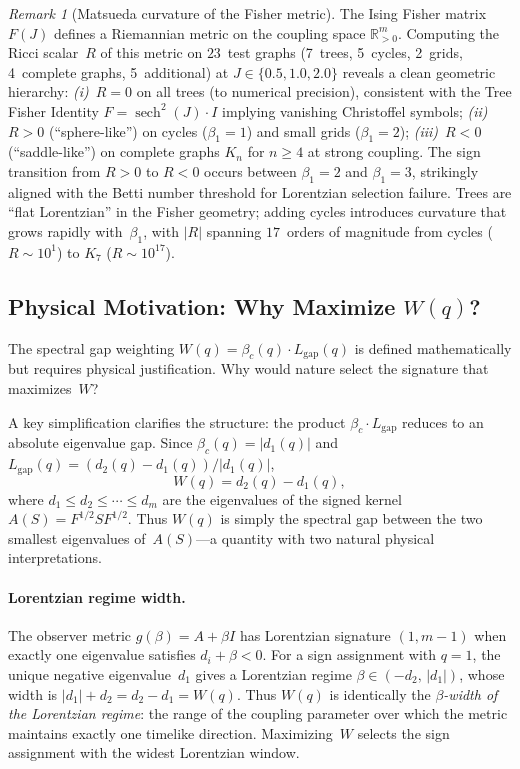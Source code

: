 \documentclass[11pt]{article}
\theoremstyle{definition}
\theoremstyle{remark}
\newtheorem{remark}[theorem]{Remark}
\begin{document}
\begin{remark}[Matsueda curvature of the Fisher metric]
\label{rem:matsueda-curvature}
The Ising Fisher matrix $F(J)$ defines a Riemannian metric on the
coupling space $\mathbb{R}^m_{>0}$. Computing the Ricci scalar~$R$ of
this metric on $23$~test graphs (7~trees, 5~cycles, 2~grids, 4~complete
graphs, 5~additional) at $J \in \{0.5, 1.0, 2.0\}$ reveals a clean
geometric hierarchy:
\emph{(i)}~$R = 0$ on all trees (to numerical precision), consistent
with the Tree Fisher Identity $F = \operatorname{sech}^2(J) \cdot I$
implying vanishing Christoffel symbols;
\emph{(ii)}~$R > 0$ (``sphere-like'') on cycles ($\beta_1 = 1$) and
small grids ($\beta_1 = 2$);
\emph{(iii)}~$R < 0$ (``saddle-like'') on complete graphs $K_n$ for
$n \geq 4$ at strong coupling.
The sign transition from $R > 0$ to $R < 0$ occurs between
$\beta_1 = 2$ and $\beta_1 = 3$, strikingly aligned with the Betti
number threshold for Lorentzian selection failure. Trees are ``flat
Lorentzian'' in the Fisher geometry; adding cycles introduces curvature
that grows rapidly with~$\beta_1$, with $|R|$ spanning $17$~orders of
magnitude from cycles ($R \sim 10^1$) to $K_7$ ($R \sim 10^{17}$).
\end{remark}

\subsection{Physical Motivation: Why Maximize $W(q)$?}

The spectral gap weighting $W(q) = \beta_c(q) \cdot L_{\mathrm{gap}}(q)$
is defined mathematically but requires physical justification. Why would
nature select the signature that maximizes~$W$?

A key simplification clarifies the structure: the product $\beta_c \cdot
L_{\mathrm{gap}}$ reduces to an absolute eigenvalue gap. Since $\beta_c(q)
= |d_1(q)|$ and $L_{\mathrm{gap}}(q) = (d_2(q) - d_1(q)) / |d_1(q)|$,
\begin{equation}
  W(q) = d_2(q) - d_1(q),
  \label{eq:W-gap}
\end{equation}
where $d_1 \leq d_2 \leq \cdots \leq d_m$ are the eigenvalues of the
signed kernel $A(S) = F^{1/2} S F^{1/2}$. Thus $W(q)$ is simply the
spectral gap between the two smallest eigenvalues of~$A(S)$---a quantity
with two natural physical interpretations.

\paragraph{Lorentzian regime width.}
The observer metric $g(\beta) = A + \beta I$ has Lorentzian signature
$(1, m{-}1)$ when exactly one eigenvalue satisfies $d_i + \beta < 0$.
For a sign assignment with $q = 1$, the unique negative eigenvalue~$d_1$
gives a Lorentzian regime $\beta \in (-d_2,\, |d_1|)$, whose width is
$|d_1| + d_2 = d_2 - d_1 = W(q)$. Thus $W(q)$ is identically the
\emph{$\beta$-width of the Lorentzian regime}: the range of the coupling
parameter over which the metric maintains exactly one timelike direction.
Maximizing~$W$ selects the sign assignment with the widest Lorentzian window.
\end{document}

